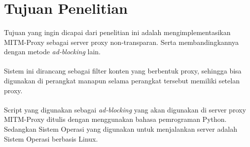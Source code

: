 \documentclass[./bab_1.tex]{subfiles}
\begin{document}
\section{Tujuan Penelitian}
  \paragraph*{}Tujuan yang ingin dicapai dari penelitian ini
  adalah mengimplementasikan MITM-Proxy sebagai server proxy
  non-transparan. Serta membandingkannya dengan metode
  \textit{ad-blocking} lain.

  \paragraph*{}Sistem ini dirancang sebagai filter konten
  yang berbentuk proxy, sehingga bisa digunakan di perangkat
  manapun selama perangkat tersebut memiliki setelan proxy.

  \paragraph*{}Script yang digunakan sebagai
  \textit{ad-blocking} yang akan digunakan di server proxy
  MITM-Proxy ditulis dengan menggunakan bahasa pemrograman
  Python. Sedangkan Sistem Operasi yang digunakan untuk
  menjalankan server adalah Sistem Operasi berbasis Linux.
\end{document}
